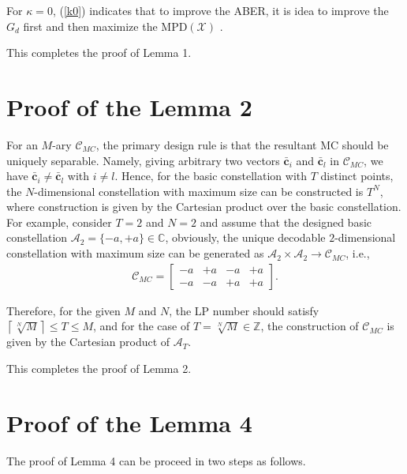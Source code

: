 \documentclass[journal]{IEEEtran}
\begin{document}
For $\kappa=0$,  (\ref{k0})   indicates that to improve the ABER, it is idea to improve the $G_d$ first and then maximize the $\text{MPD}(\boldsymbol {\mathcal X})$ \cite{xin2003space}.
   
     
  This completes the proof of Lemma 1.


\section{Proof of the Lemma 2}
\label{AppeB}
   For an $M$-ary  $  \boldsymbol {\mathcal C}_{MC}$,  the primary design rule is that the resultant MC should be uniquely separable.  Namely, giving arbitrary two vectors $\mathbf {\bar c}_{i}  $ and $ \mathbf {\bar c}_{l} $  in  $  \boldsymbol {\mathcal C}_{MC}$, we have  $\mathbf {\bar c}_{i}  \neq \mathbf {\bar c}_{l} $ with $ i \neq l$. Hence, for the basic constellation with $T$ distinct points, the $N$-dimensional constellation with maximum size can be constructed is $T^N$, where construction is given by the Cartesian product over the basic  constellation. For example,  consider $T=2$ and $N=2$  and assume that the designed basic constellation $\mathcal A_2 = \{-a, +a\}  \in \mathbf {\mathbb C}$, obviously, the unique decodable $2$-dimensional constellation with maximum size  can be  generated as 
   $ \mathcal A_2 \times \mathcal A_2  \rightarrow \boldsymbol {\mathcal C}_{MC} $, i.e.,
   \begin{equation}
\begin{aligned} \boldsymbol {\mathcal C}_{MC}=\left [{ \begin{matrix} -a&+a&-a&+a\\ -a&-a&+a&+a \end{matrix} }\right].
\end{aligned}
\end{equation}
 
Therefore, for the given $M$ and $N$, the LP number should satisfy $\left\lceil   {\sqrt[N]{M}}\right\rceil  \leq T \leq M$, and for the case  of $ {T = \sqrt[N]{M}} \in \mathbb Z$, the construction of $ \boldsymbol {\mathcal C}_{MC} $ is given by the Cartesian product of $\mathcal A _{{T}}$.
   
This completes the proof of Lemma 2.

\section{Proof of the Lemma 4} 
\label{AppeC}

The proof of Lemma 4 can be proceed in two steps as follows.
\end{document}
